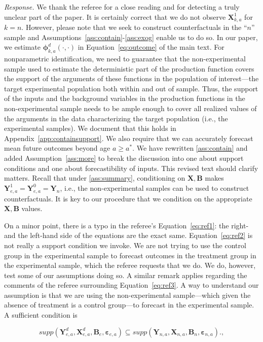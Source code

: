 \noindent \textit{Response.} We thank the referee for a close reading and for detecting a truly unclear part of the paper. It is certainly correct that we do not observe $\bm{X}_{k,a}^1$ for $k = n$. However, please note that we seek to construct counterfactuals in the ``$n$'' sample and Assumptions~\ref{ass:contain}-\ref{ass:exog} enable us to do so. In our paper, we estimate $\bm{\phi}_{k,a}^d \left( \cdot, \cdot \right)$ in Equation~\eqref{eq:outcome} of the main text. For nonparametric identification, we need to guarantee that the non-experimental sample used to estimate the deterministic part of the production function covers the support of the arguments of these functions in the population of interest---the target experimental population both within and out of sample. Thus, the support of the inputs and the background variables in the production functions in the non-experimental sample needs to be ample enough to cover all realized values of the arguments in the data characterizing the target population (i.e., the experimental samples). We document that this holds in Appendix~\ref{app:containsupport}. We also require that we can accurately forecast mean future outcomes beyond age $a\geq a^*$. We have rewritten \ref{ass:contain} and added Assumption~\ref{ass:more} to break the discussion into one about support conditions and one about forecastibility of inputs. This revised text should clarify matters. Recall that under \ref{ass:summary}, conditioning on $\bm{X}, \bm{B}$ makes $\bm{Y}^1_{e,a} = \bm{Y}^0_{e,a} = \bm{Y}_n$, i.e., the non-experimental samples can be used to construct counterfactuals. It is key to our procedure that we condition on the appropriate $\bm{X},\bm{B}$ values.

On a minor point, there is a typo in the referee's Equation~\eqref{eq:ref1}: the right- and the left-hand side of the equations are the exact same. Equation~\eqref{eq:ref2} is not really a support condition we invoke. We are not trying to use the control group in the experimental sample to forecast outcomes in the treatment group in the experimental sample, which the referee requests that we do. We do, however, test some of our assumptions doing so. A similar remark applies regarding the comments of the referee surrounding Equation~\eqref{eq:ref3}. A way to understand our assumption is that we are using the non-experimental sample---which given the absence of treatment is a control group---to forecast in the experimental sample. A sufficient condition is 

\begin{equation}
supp( \bm{Y}_{e,a}^d, \bm{X}^d_{e,a}, \bm{B}_e, \bm{\varepsilon}_{e,a} ) \subseteq supp( \bm{Y}_{n,a}, \bm{X}_{n,a}, \bm{B}_n, \bm{\varepsilon}_{n,a} ).  \label{eq:ref4},
\end{equation}

